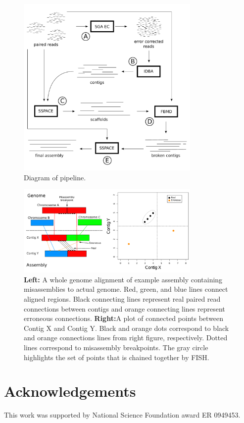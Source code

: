 \documentclass{bioinfo}
\begin{document}
\begin{figure}[t]
\includegraphics[width=3.5in]{a5pipeline-diagram.pdf}
\vspace{-1cm}
\caption{Diagram of pipeline. }\label{fig:01}
\end{figure}

\begin{figure}[t]
\includegraphics[width=3.5in]{fish-qc.pdf}
\vspace{-1cm}
\caption{\textbf{Left:}  A whole genome alignment of example assembly containing misassemblies to actual genome. 
Red, green, and blue lines connect aligned regions. Black connecting lines represent real paired read 
connections between contigs and orange connecting lines represent erroneous connections. \textbf{Right:}A plot 
of connected points between Contig X and Contig Y. Black and orange dots correspond
to black and orange connections lines from right figure, respectively. Dotted lines correspond
to misassembly breakpoints. The gray circle highlights the set of points that is chained together
by FISH. }\label{fig:02}
\end{figure}




\section*{Acknowledgements}
This work was supported by National Science Foundation award ER 0949453.



\end{document}

